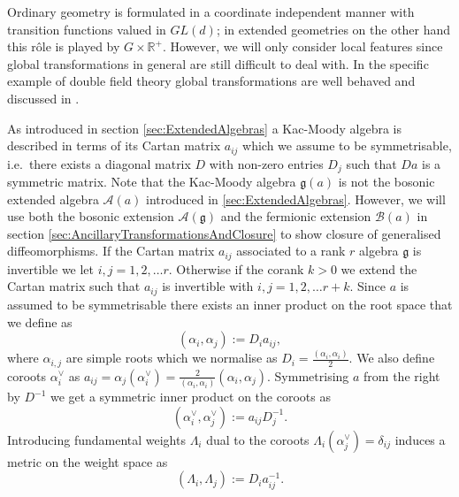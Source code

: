 Ordinary geometry is formulated in a coordinate independent manner with transition functions valued in $GL(d)$; in extended geometries on the other hand this rôle is played by $G\times\mathbb{R}^+$. However, we will only consider local features since global transformations in general are still difficult to deal with. In the specific example of double field theory global transformations are well behaved and discussed in \cite{Hohm:2012gk,Berman:2014jba}.

As introduced in section \ref{sec:ExtendedAlgebras} a Kac-Moody algebra is described in terms of its Cartan matrix $a_{ij}$ which we assume to be symmetrisable, i.e.\ there exists a diagonal matrix $D$ with non-zero entries $D_j$ such that $Da$ is a symmetric matrix. Note that the Kac-Moody algebra $\mathfrak{g}(a)$ is not the bosonic extended algebra $\mathscr{A}(a)$ introduced in \ref{sec:ExtendedAlgebras}. However, we will use both the bosonic extension $\mathscr{A}(\mathfrak{g})$ and the fermionic extension $\mathscr{B}(a)$ in section \ref{sec:AncillaryTransformationsAndClosure} to show closure of generalised diffeomorphisms. If the Cartan matrix $a_{ij}$ associated to a rank $r$ algebra $\mathfrak{g}$ is invertible we let $i,j=1,2,\ldots r$. Otherwise if the corank $k>0$ we extend the Cartan matrix such that $a_{ij}$ is invertible with $i,j=1,2,\ldots r+k$. Since $a$ is assumed to be symmetrisable there exists an inner product on the root space that we define as 
\begin{equation}
    (\alpha_i,\alpha_j) := D_ia_{ij},
\end{equation}
where $\alpha_{i,j}$ are simple roots which we normalise as $D_i=\frac{(\alpha_i,\alpha_i)}{2}$. We also define coroots $\alpha_i^\vee$ as $a_{ij} =\alpha_j(\alpha_i^\vee) = \frac{2}{(\alpha_i,\alpha_i)}(\alpha_i,\alpha_j)$. Symmetrising $a$ from the right by $D^{-1}$ we get a symmetric inner product on the coroots as 
\begin{equation}
    (\alpha_i^\vee,\alpha_j^\vee) := a_{ij}D^{-1}_j. 
\end{equation}
Introducing fundamental weights $\Lambda_i$ dual to the coroots $\Lambda_i(\alpha_j^\vee)=\delta_{ij}$ induces a metric on the weight space as 
\begin{equation}
    (\Lambda_i,\Lambda_j) := D_ia^{-1}_{ij}.
\end{equation}


